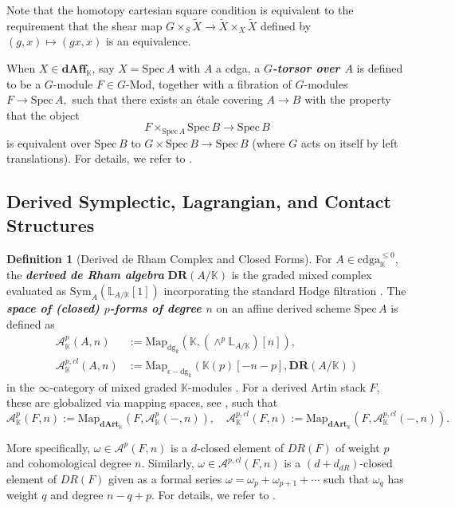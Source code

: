 \documentclass[reqno]{amsart}
\theoremstyle{definition}
\newtheorem{definition}[theorem]{Definition}
\theoremstyle{remark}
\newcommand{\LL}{\mathbb{L}}
\newcommand{\K}{\mathbb{K}}
\newcommand{\DR}{\mathbf{DR}}
\newcommand{\Spec}{\mathrm{Spec\,}}
\newcommand{\dArt}{\mathbf{dArt}}
\newcommand{\bfem}[1]{\textbf{\textit{#1}}}
\begin{document}
Note that the homotopy cartesian square condition is equivalent to the requirement that the shear map $G \times_S \widetilde{X} \to \widetilde{X} \times_X \widetilde{X}$ defined by $(g, x) \mapsto (gx, x)$ is an equivalence.

When $X\in \mathbf{dAff}_\K$,  say $X=\Spec A$ with $A$ a cdga,  a \bfem{$G$-torsor over $A$} is defined to be a $G$-module $F \in G\text{-Mod}$, together with a fibration of $G$-modules
\(
F \longrightarrow \Spec A,
\)
such that there exists an étale covering $A \longrightarrow B$ with the property that the object
\[
F \times_{\Spec A} \Spec B \longrightarrow \Spec B
\]
is equivalent over $\Spec B$ to
\(
G \times \Spec B \longrightarrow \Spec B
\) (where $G$ acts on itself by left translations). For details, we refer to \cite[Section 3.4]{TV2}.

\subsection{Derived Symplectic, Lagrangian, and Contact Structures}
\label{sec:structures}

\begin{definition}[Derived de Rham Complex and Closed Forms]
  For $A \in \mathrm{cdga}_\K^{\leq 0}$, the \bfem{derived de Rham
  algebra} $\DR(A/\K)$ is the graded mixed complex evaluated as
  $\mathrm{Sym}_A(\LL_{A/\K}[1])$ incorporating the standard Hodge
  filtration \cite[Section 1.4.1]{CPTVV}.
  The \bfem{space of (closed) $p$-forms of degree $n$} on an affine derived
  scheme $\Spec A$ is defined as
  \begin{align*}
\mathcal{A}^{p}_\K(A,n)
    &:= \mathrm{Map}_{\mathrm{dg}_k}(\K, (\wedge^p\LL_{A/\K})[n]), \\
\mathcal{A}^{p,cl}_\K(A,n)
    &:= \mathrm{Map}_{\epsilon-\mathrm{dg}_k}(\K(p)[-n-p],\DR(A/\K))
  \end{align*}
  in the $\infty$-category of mixed graded $\K$-modules \cite[Definition
  1.8]{PTVV}. For a derived Artin stack $F$, these are globalized via
  mapping spaces, see \cite[Definition 1.12]{PTVV}, such that
  \begin{equation*}
    \mathcal{A}^{p}_\K(F,n) :=
    \mathrm{Map}_{\dArt_\K}(F, \mathcal{A}^{p}_\K(-, n)), \quad \mathcal{A}^{p,cl}_\K(F,n) :=
    \mathrm{Map}_{\dArt_\K}(F, \mathcal{A}^{p,cl}_\K(-, n)).
  \end{equation*}  
\end{definition}
More specifically, $\omega \in \mathcal{A}^p(F,n)$ is a $d$-closed element of $DR(F)$ of weight $p$ and cohomological degree $n$. Similarly, $\omega \in \mathcal{A}^{p,cl}(F,n)$ is a $(d+d_{dR})$-closed element  of $DR(F)$ given as a formal series $\omega=\omega_p+\omega_{p+1} + \cdots$ such that $\omega_q$ has weight $q$ and degree $n-q+p$. For details, we refer to \cite{PTVV}.
\end{document}
